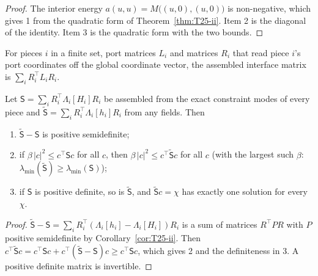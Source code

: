 \begin{proof}
  \leanok
  The interior energy $a(u,u)=M\bigl((u,0),(u,0)\bigr)$ is non-negative, which
  gives 1 from the quadratic form of Theorem~\ref{thm:T25-ii}.  Item 2 is the
  diagonal of the identity.  Item 3 is the quadratic form with the two bounds.
\end{proof}

\begin{definition}[Assembly]\label{def:assemble}
  \leanok
  For pieces $i$ in a finite set, port matrices $L_i$ and matrices $R_i$ that
  read piece $i$'s port coordinates off the global coordinate vector, the
  assembled interface matrix is $\sum_iR_i^\top L_iR_i$.
\end{definition}

\begin{theorem}\label{thm:T25-iii}
  \leanok
  Let $\mathsf S=\sum_iR_i^\top\Lambda_i[H_i]R_i$ be assembled from the exact
  constraint modes of every piece and
  $\tilde{\mathsf S}=\sum_iR_i^\top\Lambda_i[h_i]R_i$ from any fields.  Then
  \begin{enumerate}
    \item $\tilde{\mathsf S}-\mathsf S$ is positive semidefinite;
    \item if $\beta\,|c|^2\le c^\top\mathsf Sc$ for all $c$, then
      $\beta\,|c|^2\le c^\top\tilde{\mathsf S}c$ for all $c$ (with the largest
      such $\beta$: $\lambda_{\min}(\tilde{\mathsf S})\ge\lambda_{\min}(\mathsf S)$);
    \item if $\mathsf S$ is positive definite, so is $\tilde{\mathsf S}$, and
      $\tilde{\mathsf S}c=\chi$ has exactly one solution for every $\chi$.
  \end{enumerate}
\end{theorem}

\begin{proof}
  \leanok
  $\tilde{\mathsf S}-\mathsf S=\sum_iR_i^\top(\Lambda_i[h_i]-\Lambda_i[H_i])R_i$
  is a sum of matrices $R^\top PR$ with $P$ positive semidefinite by
  Corollary~\ref{cor:T25-ii}.  Then
  $c^\top\tilde{\mathsf S}c=c^\top\mathsf Sc+c^\top(\tilde{\mathsf S}-\mathsf S)c
  \ge c^\top\mathsf Sc$, which gives 2 and the definiteness in 3.  A positive
  definite matrix is invertible.
\end{proof}


